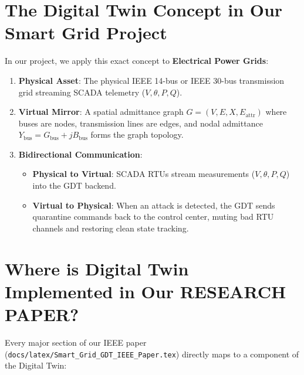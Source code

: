 \documentclass[11pt,a4paper]{article}
\begin{document}
\section{The Digital Twin Concept in Our Smart Grid Project}

In our project, we apply this exact concept to \textbf{Electrical Power Grids}:

\begin{enumerate}
    \item \textbf{Physical Asset}: The physical IEEE 14-bus or IEEE 30-bus transmission grid streaming SCADA telemetry ($V, \theta, P, Q$).
    \item \textbf{Virtual Mirror}: A spatial admittance graph $G = (V, E, X, E_{\text{attr}})$ where buses are nodes, transmission lines are edges, and nodal admittance $Y_{\text{bus}} = G_{\text{bus}} + jB_{\text{bus}}$ forms the graph topology.
    \item \textbf{Bidirectional Communication}:
    \begin{itemize}
        \item \textbf{Physical to Virtual}: SCADA RTUs stream measurements ($V, \theta, P, Q$) into the GDT backend.
        \item \textbf{Virtual to Physical}: When an attack is detected, the GDT sends quarantine commands back to the control center, muting bad RTU channels and restoring clean state tracking.
    \end{itemize}
\end{enumerate}

\section{Where is Digital Twin Implemented in Our RESEARCH PAPER?}

Every major section of our IEEE paper (\texttt{docs/latex/Smart\_Grid\_GDT\_IEEE\_Paper.tex}) directly maps to a component of the Digital Twin:
\end{document}
